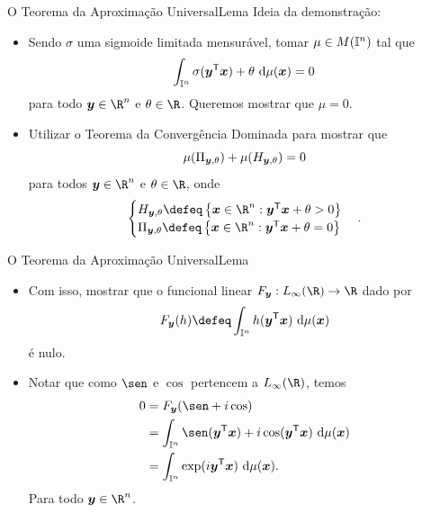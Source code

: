 \documentclass[13pt]{beamer}
\begin{document}
\begin{frame}{O Teorema da Aproximação Universal}{Lema}
    Ideia da demonstração:
    \begin{itemize}
        \item<1-> Sendo \( \sigma \) uma sigmoide limitada mensurável, tomar \( \mu \in M ( \mathbb{I}^{ n } ) \) tal que
            \begin{equation*}
                \int_{ \mathbb{I}^{ n } } \sigma ( \bm{y}^{ \mathsf{T} } \bm{x} ) + \theta \ \mathrm{d} \mu ( \bm{x} ) = 0
            \end{equation*}
            para todo \( \bfy \in \R^{ n } \) e \( \theta \in \R \).
            Queremos mostrar que \( \mu = 0 \).
        \item<2-> Utilizar o Teorema da Convergência Dominada para mostrar que
            \begin{equation*}
                \mu ( \Pi_{ \bm{y}, \theta } ) + \mu ( H_{ \bm{y}, \theta } ) = 0
            \end{equation*}
            para todos \( \bfy \in \R^{ n } \) e \( \theta \in \R \), onde
            \begin{equation*}
                \begin{cases}
                    H_{ \bfy, \theta } \defeq \left\{ \bfx \in \R^{ n } : \bfy^{ \transpose } \bfx + \theta > 0 \right\} \\
                    \Pi_{ \bfy, \theta } \defeq \left\{ \bfx \in \R^{ n } : \bfy^{ \transpose } \bfx + \theta = 0 \right\} \\
                \end{cases}
            .\end{equation*}
    \end{itemize}
\end{frame}


\begin{frame}{O Teorema da Aproximação Universal}{Lema}
    \begin{itemize}
        \item<1-> Com isso, mostrar que o funcional linear \( F_{ \bfy } : L_{ \infty } ( \R ) \to \R \) dado por
            \begin{equation*}
                F_{ \bfy } ( h ) \defeq \int_{ \I^{ n } } h ( \bfy^{ \transpose } \bfx ) \ \mathrm{d} \mu ( \bfx )
            \end{equation*}
            é nulo.
        \item<2-> Notar que como \( \sen \) e \( \cos \) pertencem a \( L_{ \infty } ( \R ) \), temos
            \begin{align*}
                0 &= F_{ \bfy } ( \sen + i \cos ) \\
                  &= \int_{ \I^{ n } } \sen ( \bfy^{ \transpose } \bfx ) + i \cos ( \bfy^{ \transpose } \bfx ) \ \mathrm{d} \mu ( \bfx ) \\
                  &= \int_{ \I^{ n } } \exp ( i \bfy^{ \transpose } \bfx ) \ \mathrm{d} \mu ( \bfx )
            .\end{align*}
            Para todo \( \bfy \in \R^{ n } \).
    \end{itemize}
\end{frame}
\end{document}
